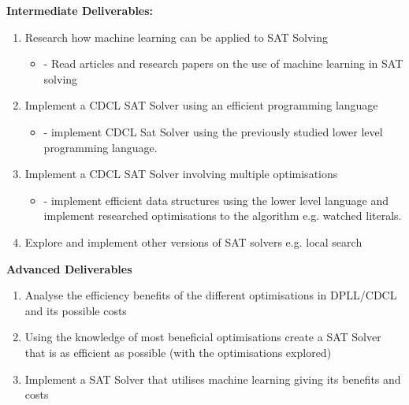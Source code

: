 \documentclass[12pt,a4paper]{article}
\begin{document}
{\bf Intermediate Deliverables:}
	\begin{enumerate}
		\item Research how machine learning can be applied to SAT Solving
			\begin{itemize}
				\item{- Read articles and research papers on the use of machine learning in SAT solving}
			\end{itemize}
		\item Implement a CDCL SAT Solver using an efficient programming language
			\begin{itemize}
				\item{- implement CDCL Sat Solver using the previously studied lower level programming language.}
			\end{itemize}
		\item Implement a CDCL SAT Solver involving multiple optimisations
			\begin{itemize}
				\item{- implement efficient data structures using the lower level language and implement researched optimisations to the algorithm e.g. watched literals.}
			\end{itemize}
		\item Explore and implement other versions of SAT solvers e.g. local search
	\end{enumerate}
{\bf Advanced Deliverables}
	\begin{enumerate}
		\item Analyse the efficiency benefits of the different optimisations in DPLL/CDCL and its possible costs
		\item Using the knowledge of most beneficial optimisations create a SAT Solver that is as efficient as possible (with the optimisations explored)
		\item Implement a SAT Solver that utilises machine learning giving its benefits and costs
	\end{enumerate}





\end{document}
